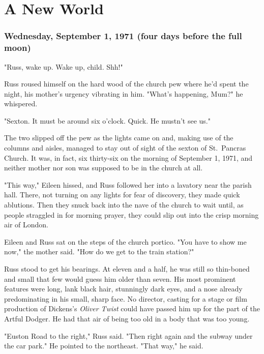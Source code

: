 
\chapter{A New World}

\subsection{Wednesday, September 1, 1971 (four days before the full moon)}

"Russ, wake up. Wake up, child. Shh!"

Russ roused himself on the hard wood of the church pew where he'd spent the night, his mother's urgency vibrating in him. "What's happening, Mum?" he whispered.

"Sexton. It must be around six o'clock. Quick. He mustn't see us."

The two slipped off the pew as the lights came on and, making use of the columns and aisles, managed to stay out of sight of the sexton of St.~Pancras Church. It was, in fact, six thirty-six on the morning of September 1, 1971, and neither mother nor son was supposed to be in the church at all.

"This way," Eileen hissed, and Russ followed her into a lavatory near the parish hall. There, not turning on any lights for fear of discovery, they made quick ablutions. Then they snuck back into the nave of the church to wait until, as people straggled in for morning prayer, they could slip out into the crisp morning air of London.

Eileen and Russ sat on the steps of the church portico. "You have to show me now," the mother said. "How do we get to the train station?"

Russ stood to get his bearings. At eleven and a half, he was still so thin-boned and small that few would guess him older than seven. His most prominent features were long, lank black hair, stunningly dark eyes, and a nose already predominating in his small, sharp face. No director, casting for a stage or film production of Dickens's \emph{Oliver Twist} could have passed him up for the part of the Artful Dodger. He had that air of being too old in a body that was too young.

"Euston Road to the right," Russ said. "Then right again and the subway under the car park." He pointed to the northeast. "That way," he said.

